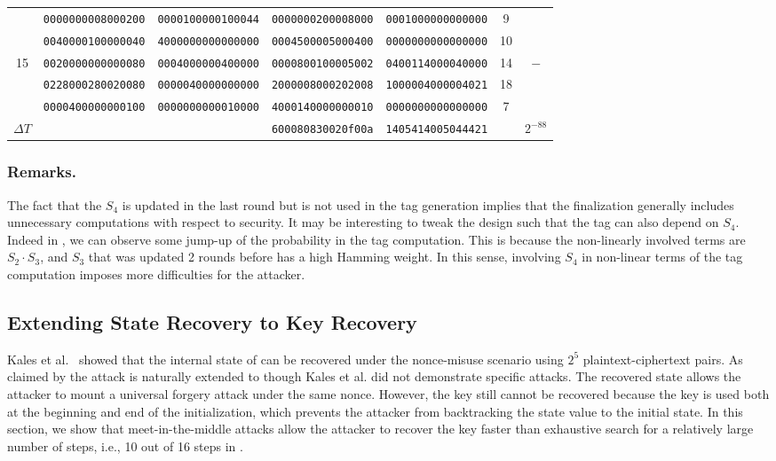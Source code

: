 \begin{table}[!tb]
\begin{center}
{\begin{tabular}{ccccccc}
      & {\tt 0000000008000200} & {\tt 0000100000100044} & {\tt 0000000200008000} & {\tt 0001000000000000} & 9  & \\
      & {\tt 0040000100000040} & {\tt 4000000000000000} & {\tt 0004500005000400} & {\tt 0000000000000000} & 10 & \\
15    & {\tt 0020000000000080} & {\tt 0004000000400000} & {\tt 0000800100005002} & {\tt 0400114000040000} & 14 & $-$\\
      & {\tt 0228000280020080} & {\tt 0000040000000000} & {\tt 2000008000202008} & {\tt 1000004000004021} & 18 & \\
      & {\tt 0000400000000100} & {\tt 0000000000010000} & {\tt 4000140000000010} & {\tt 0000000000000000} & 7  & \\ \hline

$\Delta T$ &                   &                        & {\tt 600080830020f00a} & {\tt 1405414005044421} & & $2^{-88}$ \\ \hline
\end{tabular}
}
\end{center}
\end{table}

\subsubsection{Remarks.} The fact that the $S_4$ is updated in the last round but is not used in the tag generation implies that the \MORUS finalization generally includes unnecessary computations with respect to security. It may be interesting to tweak the design such that the tag can also depend on $S_4$. Indeed in , we can observe some jump-up of the probability in the tag computation. This is because the non-linearly involved terms are $S_2 \cdot S_3$, and $S_3$ that was updated 2 rounds before has a high Hamming weight. In this sense, involving $S_4$ in non-linear terms of the tag computation imposes more difficulties for the attacker.




\subsection{Extending State Recovery to Key Recovery}
\label{subsec/Ini}
Kales et al.~\cite{cryptoeprint:2017:1137} showed that the internal state of \MORUS[640] can be recovered under the nonce-misuse scenario using $2^5$ plaintext-ciphertext pairs. As claimed by \cite{cryptoeprint:2017:1137} the attack is naturally extended to \MORUS[1280] though Kales et al. \cite{cryptoeprint:2017:1137} did not demonstrate specific attacks. The recovered state allows the attacker to mount a universal forgery attack under the same nonce. However, the key still cannot be recovered because the key is used both at the beginning and end of the initialization, which prevents the attacker from backtracking the state value to the initial state. In this section, we show that meet-in-the-middle attacks allow the attacker to recover the key faster than exhaustive search for a relatively large number of steps, i.e., 10 out of 16 steps in \MORUS[1280]. 

